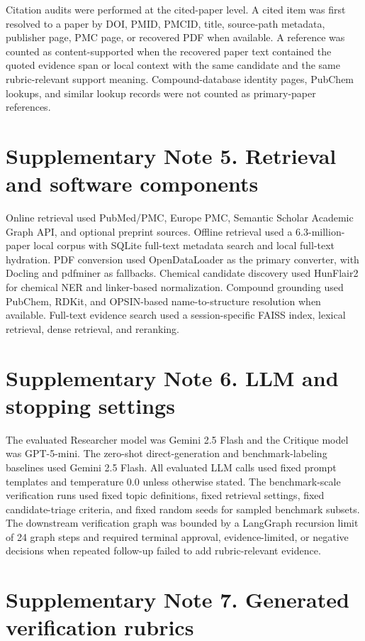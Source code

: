 \documentclass[10pt]{article}
\begin{document}
Citation audits were performed at the cited-paper level. A cited item was first resolved to a paper by DOI, PMID, PMCID, title, source-path metadata, publisher page, PMC page, or recovered PDF when available. A reference was counted as content-supported when the recovered paper text contained the quoted evidence span or local context with the same candidate and the same rubric-relevant support meaning. Compound-database identity pages, PubChem lookups, and similar lookup records were not counted as primary-paper references.

\section*{Supplementary Note 5. Retrieval and software components}

Online retrieval used PubMed/PMC, Europe PMC, Semantic Scholar Academic Graph API, and optional preprint sources. Offline retrieval used a 6.3-million-paper local corpus with SQLite full-text metadata search and local full-text hydration. PDF conversion used OpenDataLoader as the primary converter, with Docling and pdfminer as fallbacks. Chemical candidate discovery used HunFlair2 for chemical NER and linker-based normalization. Compound grounding used PubChem, RDKit, and OPSIN-based name-to-structure resolution when available. Full-text evidence search used a session-specific FAISS index, lexical retrieval, dense retrieval, and reranking.

\section*{Supplementary Note 6. LLM and stopping settings}

The evaluated Researcher model was Gemini 2.5 Flash and the Critique model was GPT-5-mini. The zero-shot direct-generation and benchmark-labeling baselines used Gemini 2.5 Flash. All evaluated LLM calls used fixed prompt templates and temperature 0.0 unless otherwise stated. The benchmark-scale verification runs used fixed topic definitions, fixed retrieval settings, fixed candidate-triage criteria, and fixed random seeds for sampled benchmark subsets. The downstream verification graph was bounded by a LangGraph recursion limit of 24 graph steps and required terminal approval, evidence-limited, or negative decisions when repeated follow-up failed to add rubric-relevant evidence.

\section*{Supplementary Note 7. Generated verification rubrics}
\end{document}
